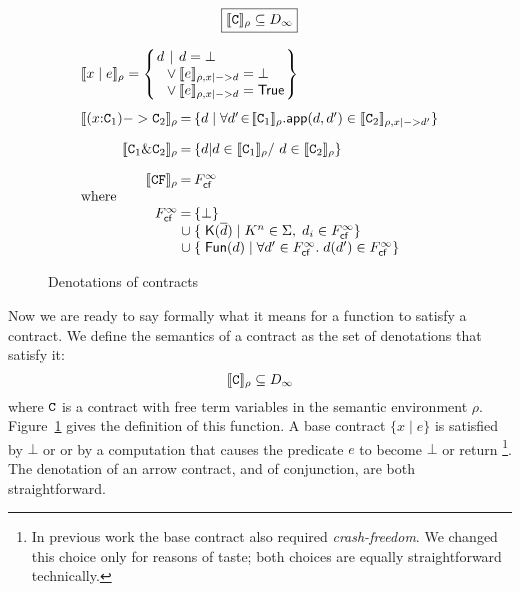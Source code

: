 \begin{figure}
$$
\setlength{\arraycolsep}{1pt}
\begin{array}{rcl}
\multicolumn{3}{c}{
\ruleform{\dbrace{\Ct}_{\rho} \subseteq D_{\infty}} }
\\ \\
\multicolumn{3}{l}{
\dbrace{x \mid e}_\rho 
  =  \left\{ \begin{array}{rcl} d & \mid & \unroll{d} = \bot \\
              & \lor & \unroll{\dbrace{e}_{\rho,x|->d}} = \bot \\
              & \lor & \unroll{\dbrace{e}_{\rho,x|->d}} = \ret{\injKZ{True}}
             \end{array} \right\} 
}
\\[2em]
\dbrace{(x{:}\Ct_1) -> \Ct_2}_{\rho} 
 & = & \{ d \mid
           \forall d' \!\in\! \dbrace{\Ct_1}_\rho.
           \dapp(d,d') \in \dbrace{\Ct_2}_{\rho,x|->d'}
           \}
\\[1em]
\dbrace{\Ct_1 \& \Ct_2}_\rho 
 & = & \{ d | d \in \dbrace{\Ct_1}_\rho /\ d \in \dbrace{\Ct_2}_\rho \}
\\[1em]
\dbrace{\CF}_\rho & = &  \Fcf^{\infty}  \\ 
\multicolumn{3}{l}{\text{where}} \\ 
   F_{\lcfZ}^{\infty} & = & \{ \bot \} \\
                   & \cup & \{\;\injK{K}{\ol{d}} \mid K^n \in \Sigma,\; d_i \in F_{\lcfZ}^{\infty} \} \\
                   & \cup & \{\;\injFun{d} \mid \forall d' \in F_{\lcfZ}^{\infty}.\; d(d') \in F_{\lcfZ}^{\infty} \}
\end{array}
$$
\caption{Denotations of contracts} \label{f:den-sem-contracts}
\end{figure}

Now we are ready to say formally what it means for a function to satisfy a contract.
We define the semantics of a contract as the set of denotations that satisfy it:
\[              [\![{\tt C}]\!]_\rho \subseteq D_\infty  \]
where ${\tt C}$ is a contract with free term variables in the semantic environment $\rho$. 
Figure~\ref{f:den-sem-contracts} gives the definition of this function.
A base contract $\{x \mid e\}$ is satisfied by $\bot$ or 
or by a computation that causes the predicate $e$ to become $\bot$
or return \True\footnote{
In previous
work \cite{xu+:contracts} the base contract also 
required {\em crash-freedom}. 
We changed this choice only for reasons of taste; both choices
are equally straightforward technically.}.
The denotation of an arrow contract, and of conjunction, are both straightforward.


